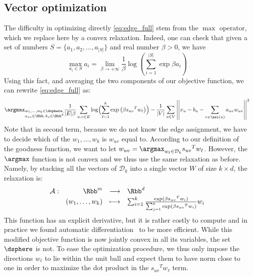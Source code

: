 \subsection{Vector optimization}
\label{sub:edge_vector}

The difficulty in optimizing directly \eqref{eq:edge_full} stem from the $\max$ operator, which we
replace here by a convex relaxation. Indeed, one can check that given a set of numbers $S=\{a_1,
a_2, \ldots, a_{|S|}\}$ and real number $\beta > 0$, we have
\begin{equation*}
  \max_{a_i \in S} a_i = \lim_{\beta \rightarrow + \infty} \frac{1}{\beta}
  \log\left( \sum_{i=1}^{|S|} \exp{\beta a_i} \right)
\end{equation*}
Using this fact, and averaging the two components of our objective function, we can rewrite
\eqref{eq:edge_full} as:
\begin{equation}
  \label{eq:edge_soft}
  \argmax_{{\substack{w_1,\ldots,w_k \in \dsphere,\\
  a_{uv}\in\Rbb,\, b_u \in \Rbb^d}}}
  \frac{1}{|E|\beta} \sum_{u,v\in E}
  \log\Bigl(\sum_{\ell=1}^k\exp\left(\beta {s_{uv}}^T w_\ell \right)\Bigr)
  - \frac{1}{|V|}\sum_{u\in V}
  \left|\left| x_u - b_u - \sum_{v \in \nei(u)} a_{uv} w_{uv} \right|\right|^2
\end{equation}
Note that in second term, because we do not know the edge assignment, we have to decide which of the
$w_1, \ldots, w_k$ is $w_{uv}$ equal to. According to our definition of the goodness function, we
want to let $w_{uv} = \argmax_{w_\ell \in \mathcal{D}_k} {s_{uv}}^T w_\ell$. However, the $\argmax$
function is not convex and we thus use the same relaxation as before. Namely, by stacking all the
vectors of $\mathcal{D}_k$ into a single vector $W$ of size $k\times d$, the relaxation is:
$$ \begin{array}[t]{lrcl}
  \mathcal{A} : & \Rbb^m & \longrightarrow & \Rbb^d \\
      & (w_1,\ldots,w_k) & \longmapsto &
  \sum_{i=1}^k \frac{\exp(\beta{s_{uv}}^T w_i)}{\sum_{j=1}^k \exp(\beta {s_{uv}}^T w_i)} w_i
\end{array} $$
This function has an explicit derivative, but it is rather costly to compute and in practice we
found automatic differentiation~\autocite{autograd15} to be more efficient. While this modified
objective function is now jointly convex in all its variables, the set $\dsphere$ is not. To ease
the optimization procedure, we thus only impose the directions $w_\ell$ to lie within the unit ball
and expect them to have norm close to one in order to maximize the dot product in the ${s_{uv}}^T
w_\ell$ term.


